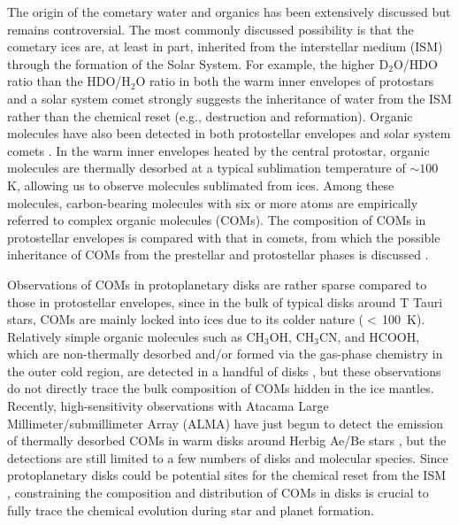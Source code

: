 \documentclass[twocolumn, twocolappendix, astrosymb, times]{aastex631}
\newcommand{\methanol}{CH$_3$OH\xspace}
\begin{document}
The origin of the cometary water and organics has been extensively discussed but remains controversial. The most commonly discussed possibility is that the cometary ices are, at least in part, inherited from the interstellar medium (ISM) through the formation of the Solar System. 
For example, the higher D$_2$O/HDO ratio than the HDO/H$_2$O ratio in both the warm inner envelopes of protostars \citep{Coutens2014, Jensen2021} and a solar system comet \citep{Altwegg2017}
strongly suggests the inheritance of water from the ISM rather than the chemical reset (e.g., destruction and reformation).
Organic molecules have also been detected in both protostellar envelopes and solar system comets \citep[e.g.,][]{Jorgensen2016, Rubin2019}. In the warm inner envelopes heated by the central protostar, organic molecules are thermally desorbed at a typical sublimation temperature of $\sim100$\,K, allowing us to observe molecules sublimated from ices. Among these molecules, carbon-bearing molecules with six or more atoms are empirically referred to complex organic molecules (COMs). The composition of COMs in protostellar envelopes is compared with that in comets, from which the possible inheritance of COMs from the prestellar and protostellar phases is discussed \citep[e.g.,][]{Drozdovskaya2019}.

Observations of COMs in protoplanetary disks are rather sparse compared to those in protostellar envelopes, since in the bulk of typical disks around T Tauri stars, COMs are mainly locked into ices due to its colder nature ($<$\,100~K).  Relatively simple organic molecules such as \methanol, CH$_3$CN, and HCOOH, which are non-thermally desorbed and/or formed via the gas-phase chemistry in the outer cold region, are detected in a handful of disks \citep{Walsh2016, Oberg2015, Bergner2018, Loomis2018, Ilee2021, Favre2018}, but these observations do not directly trace the bulk composition of COMs hidden in the ice mantles. Recently, high-sensitivity observations with Atacama Large Millimeter/submillimeter Array (ALMA) have just begun to detect the emission of thermally desorbed COMs in warm disks around Herbig Ae/Be stars \citep{vanderMarel2021, Booth2021_CH3OH, Brunken2022, Booth2023_HD169142}, but the detections are still limited to a few numbers of disks and molecular species. Since protoplanetary disks could be potential sites for the chemical reset from the ISM \citep[e.g.,][]{Walsh2014, Furuya2014, Eistrup2016}, constraining the composition and distribution of COMs in disks is crucial to fully trace the chemical evolution during star and planet formation.
\end{document}
